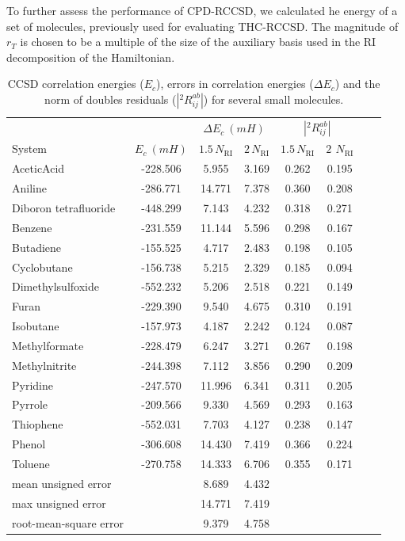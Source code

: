 To further assess the performance of CPD-RCCSD, we calculated he energy 
of a set of molecules, previously used for evaluating THC-RCCSD. The magnitude 
of $r_{T}$ is chosen to be a multiple of the size of the auxiliary basis used 
in the RI decomposition of the Hamiltonian.

\begin{center}
\begin{table}[!ht]
\caption{CCSD correlation energies ($E_c$), errors in
correlation energies ($\Delta E_c$)
and the norm of doubles residuals ($|{}^2R_{ij}^{ab}|$) for several small 
molecules.
\label{tab:energies_cpd_rccsd}}
\begin{tabular}{lccccccc}
\hline \hline
& & \multicolumn{2}{c}{$\Delta E_c~(mH)$} & 
\multicolumn{2}{c}{$|{}^2R_{ij}^{ab}|$}\\
\cline{3-4} \cline{5-6} System & $E_c~(mH)$ & $1.5 \, N_\mathrm{RI}$ &
$2 \, N_\mathrm{RI}$ & $1.5 \, N_\mathrm{RI}$ &
$2 \,~N_\mathrm{RI}$\\
\hline
AceticAcid & -228.506 & 5.955 & 3.169 & 0.262 & 0.195 \\
Aniline & -286.771 & 14.771 & 7.378 & 0.360 & 0.208 \\
Diboron tetrafluoride & -448.299 & 7.143 & 4.232 & 0.318 & 0.271 \\
Benzene & -231.559 & 11.144 & 5.596 & 0.298 & 0.167 \\
Butadiene & -155.525  & 4.717 & 2.483 & 0.198 & 0.105 \\
Cyclobutane & -156.738  & 5.215 & 2.329 & 0.185 & 0.094 \\
Dimethylsulfoxide & -552.232  & 5.206 & 2.518 & 0.221 & 0.149 \\
Furan & -229.390 & 9.540 & 4.675 & 0.310 & 0.191 \\
Isobutane & -157.973 & 4.187 & 2.242 & 0.124 & 0.087 \\
Methylformate & -228.479 & 6.247 & 3.271 & 0.267 & 0.198 \\
Methylnitrite & -244.398 & 7.112 & 3.856 & 0.290 & 0.209 \\
Pyridine & -247.570 & 11.996 & 6.341 & 0.311 & 0.205 \\
Pyrrole & -209.566 & 9.330 & 4.569 & 0.293 & 0.163 \\
Thiophene & -552.031 & 7.703 & 4.127 & 0.238 & 0.147 \\
Phenol & -306.608 & 14.430 & 7.419 & 0.366 & 0.224 \\
Toluene & -270.758 & 14.333 & 6.706 & 0.355 & 0.171 \\
mean unsigned error & & 8.689 & 4.432 & & &\\
max unsigned error & & 14.771 & 7.419 & & &\\
root-mean-square error& & 9.379 & 4.758 & & &\\
\hline\hline
\end{tabular}
\end{table}
\end{center}

